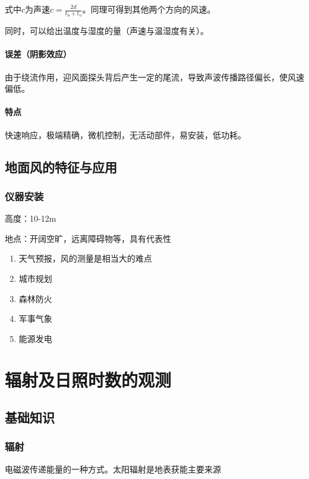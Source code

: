 \documentclass[UTF8,11pt]{ctexbook}
\begin{document}
式中\(c\)为声速\(c=\frac{2d}{t_\mathrm{b}+t_\mathrm{o}}\)。同理可得到其他两个方向的风速。

同时，可以给出温度与湿度的量（声速与温湿度有关）。

\subsubsection{误差（阴影效应）}

由于绕流作用，迎风面探头背后产生一定的尾流，导致声波传播路径偏长，使风速偏低。

\subsubsection{特点}

快速响应，极端精确，微机控制，无活动部件，易安装，低功耗。

\section{地面风的特征与应用}

\subsection{仪器安装}

高度：10-12m

地点：开阔空旷，远离障碍物等，具有代表性
\begin{enumerate}
    \item 天气预报，风的测量是相当大的难点
    \item 城市规划
    \item 森林防火
    \item 军事气象
    \item 能源发电
\end{enumerate}

\chapter{辐射及日照时数的观测}

\section{基础知识}

\subsection{辐射}

电磁波传递能量的一种方式。太阳辐射是地表获能主要来源
\end{document}
